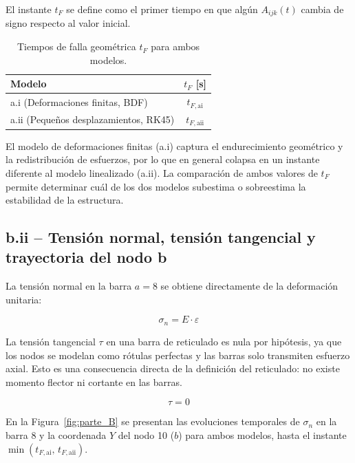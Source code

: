 \documentclass[12pt]{article}
\begin{document}
El instante $t_F$ se define como el primer tiempo en que algún $A_{ijk}(t)$ cambia de signo respecto al valor inicial.

\begin{table}[H]
    \centering
    \caption{Tiempos de falla geométrica $t_F$ para ambos modelos.}
    \label{tab:tF}
    \begin{tabular}{lc}
        \toprule
        \textbf{Modelo} & \textbf{$t_F$ [s]} \\
        \midrule
        a.i (Deformaciones finitas, BDF) & $t_{F,\text{ai}}$ \\
        a.ii (Pequeños desplazamientos, RK45) & $t_{F,\text{aii}}$ \\
        \bottomrule
    \end{tabular}
\end{table}

El modelo de deformaciones finitas (a.i) captura el endurecimiento geométrico y la redistribución de esfuerzos, por lo que en general colapsa en un instante diferente al modelo linealizado (a.ii). La comparación de ambos valores de $t_F$ permite determinar cuál de los dos modelos subestima o sobreestima la estabilidad de la estructura.

\subsection{b.ii -- Tensión normal, tensión tangencial y trayectoria del nodo b}

La tensión normal en la barra $a = 8$ se obtiene directamente de la deformación unitaria:

\begin{equation}
    \sigma_n = E \cdot \varepsilon
    \label{eq:sigma_n}
\end{equation}

La tensión tangencial $\tau$ en una barra de reticulado es nula por hipótesis, ya que los nodos se modelan como rótulas perfectas y las barras solo transmiten esfuerzo axial. Esto es una consecuencia directa de la definición del reticulado: no existe momento flector ni cortante en las barras.

\begin{equation}
    \tau = 0
    \label{eq:tau_cero}
\end{equation}

En la Figura~\ref{fig:parte_B} se presentan las evoluciones temporales de $\sigma_n$ en la barra 8 y la coordenada $Y$ del nodo 10 ($b$) para ambos modelos, hasta el instante $\min(t_{F,\text{ai}},\, t_{F,\text{aii}})$.
\end{document}
